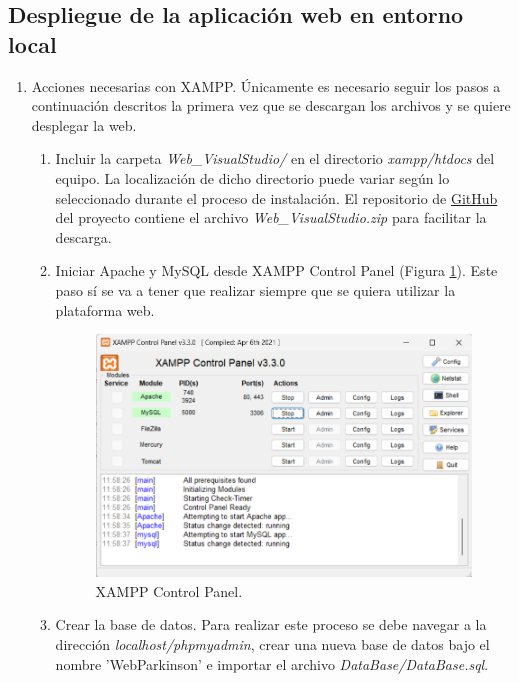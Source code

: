 \subsection{Despliegue de la aplicación web en entorno local}
\begin{enumerate}
    \item Acciones necesarias con XAMPP. Únicamente es necesario seguir los pasos a continuación descritos la primera vez que se descargan los archivos y se quiere desplegar la web.
    \begin{enumerate}
        \item Incluir la carpeta \textit{Web\_VisualStudio/} en el directorio \textit{xampp/htdocs} del equipo. La localización de dicho directorio puede variar según lo seleccionado durante el proceso de instalación. El repositorio de \href{https://github.com/imb1006/Web_Seguimiento_Parkinson}{GitHub} del proyecto contiene el archivo \textit{Web\_VisualStudio.zip} para facilitar la descarga.
        
        \item Iniciar Apache y MySQL desde XAMPP Control Panel (Figura \ref{fig:xampp}). Este paso sí se va a tener que realizar siempre que se quiera utilizar la plataforma web.
            \begin{figure}[h]
                \centering
                \includegraphics[width=1\textwidth]{img/B2_InstalacionPuestaMarcha/xampp.png}
                \caption{XAMPP Control Panel.}
                \label{fig:xampp}
            \end{figure}
            
        \item Crear la base de datos. Para realizar este proceso se debe navegar a la dirección \textit{localhost/phpmyadmin}, crear una nueva base de datos bajo el nombre 'WebParkinson' e importar el archivo \textit{DataBase/DataBase.sql}.
    \end{enumerate}
    

\end{enumerate}
